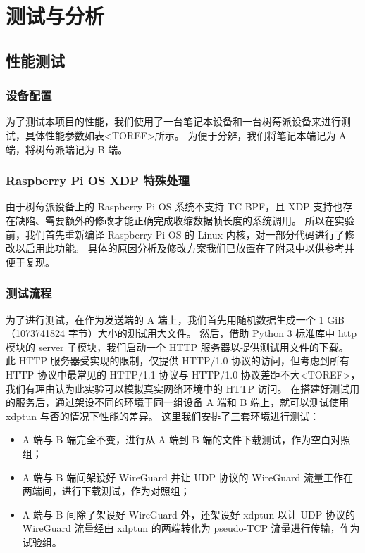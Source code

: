 

\chapter{测试与分析}

\section{性能测试}

\subsection{设备配置}

为了测试本项目的性能，我们使用了一台笔记本设备和一台树莓派设备来进行测试，具体性能参数如表<TOREF>所示。
为便于分辨，我们将笔记本端记为 A 端，将树莓派端记为 B 端。

\subsection{Raspberry Pi OS XDP 特殊处理}

由于树莓派设备上的 Raspberry Pi OS 系统不支持 TC BPF，且 XDP 支持也存在缺陷、需要额外的修改才能正确完成收缩数据帧长度的系统调用。
所以在实验前，我们首先重新编译 Raspberry Pi OS 的 Linux 内核，对一部分代码进行了修改以启用此功能。
具体的原因分析及修改方案我们已放置在了附录中以供参考并便于复现。

\subsection{测试流程}

为了进行测试，在作为发送端的 A 端上，我们首先用随机数据生成一个 1 GiB（1073741824 字节）大小的测试用大文件。
然后，借助 Python 3 标准库中 http 模块的 server 子模块，我们启动一个 HTTP 服务器以提供测试用文件的下载。
此 HTTP 服务器受实现的限制，仅提供 HTTP/1.0 协议的访问，但考虑到所有 HTTP 协议中最常见的 HTTP/1.1 协议与 HTTP/1.0 协议差距不大<TOREF>，我们有理由认为此实验可以模拟真实网络环境中的 HTTP 访问。
在搭建好测试用的服务后，通过架设不同的环境于同一组设备 A 端和 B 端上，就可以测试使用 xdptun 与否的情况下性能的差异。
这里我们安排了三套环境进行测试：

\begin{itemize}
  \item A 端与 B 端完全不变，进行从 A 端到 B 端的文件下载测试，作为空白对照组；
  \item A 端与 B 端间架设好 WireGuard 并让 UDP 协议的 WireGuard 流量工作在两端间，进行下载测试，作为对照组；
  \item A 端与 B 间除了架设好 WireGuard 外，还架设好 xdptun 以让 UDP 协议的 WireGuard 流量经由 xdptun 的两端转化为 pseudo-TCP 流量进行传输，作为试验组。
\end{itemize}

